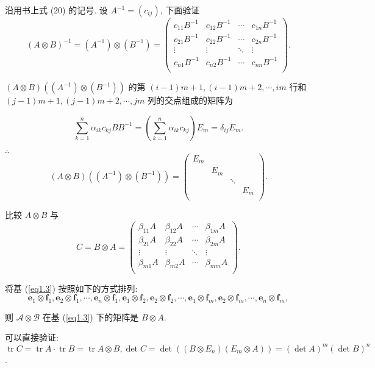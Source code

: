 \documentclass{ctexart}
\begin{document}
\begin{solution}
    沿用书上式 (20) 的记号. 设 $A^{-1}=(c_{ij})$, 下面验证
    \[(A\otimes B)^{-1}=(A^{-1})\otimes(B^{-1})=\begin{pmatrix}
        c_{11}B^{-1} & c_{12}B^{-1} & \cdots & c_{1n}B^{-1} \\
        c_{21}B^{-1} & c_{22}B^{-1} & \cdots & c_{2n}B^{-1} \\
        \vdots & \vdots & \ddots & \vdots \\
        c_{n1}B^{-1} & c_{n2}B^{-1} & \cdots & c_{nn}B^{-1} \\
    \end{pmatrix}.\]

    $(A\otimes B)((A^{-1})\otimes(B^{-1}))$ 的第 $(i-1)m+1,(i-1)m+2,\cdots,im$ 行和 $(j-1)m+1,(j-1)m+2,\cdots,jm$ 列的交点组成的矩阵为

    \[\sum\limits_{k=1}^n\alpha_{ik}c_{kj}BB^{-1}=\left(\sum\limits_{k=1}^n\alpha_{ik}c_{kj}\right)E_m=\delta_{ij}E_m.\]

    $\therefore$
    \[(A\otimes B)((A^{-1})\otimes(B^{-1}))=\begin{pmatrix}
        E_m \\
        & E_m \\
        && \ddots \\
        &&& E_m \\
    \end{pmatrix}.\]
\end{solution}
\begin{exercise}%
    比较 $A\otimes B$ 与
    \[C=B\otimes A=\begin{pmatrix}
        \beta_{11}A & \beta_{12}A & \cdots & \beta_{1m}A \\
        \beta_{21}A & \beta_{22}A & \cdots & \beta_{2m}A \\
        \vdots & \vdots & \ddots & \vdots \\
        \beta_{m1}A & \beta_{m2}A & \cdots & \beta_{mm}A \\
    \end{pmatrix}.\]
\end{exercise}
\begin{solution}
    将基 (\ref{eq1.3}) 按照如下的方式排列:
    \[\boldsymbol{e}_1\otimes\boldsymbol{f}_1,\boldsymbol{e}_2\otimes\boldsymbol{f}_1,\cdots,\boldsymbol{e}_n\otimes\boldsymbol{f}_1,\boldsymbol{e}_1\otimes\boldsymbol{f}_2,\boldsymbol{e}_2\otimes\boldsymbol{f}_2,\cdots,\boldsymbol{e}_1\otimes\boldsymbol{f}_m,\boldsymbol{e}_2\otimes\boldsymbol{f}_m,\cdots,\boldsymbol{e}_n\otimes\boldsymbol{f}_m,\]

    则
    $\mathcal{A}\otimes\mathcal{B}$ 在基 (\ref{eq1.3}) 下的矩阵是 $B\otimes A$.

    可以直接验证: $\operatorname{tr}C=\operatorname{tr}A\cdot\operatorname{tr}B=\operatorname{tr}A\otimes B,\det C=\det((B\otimes E_n)(E_m\otimes A))=(\det A)^m(\det B)^n$.
\end{solution}
\end{document}
